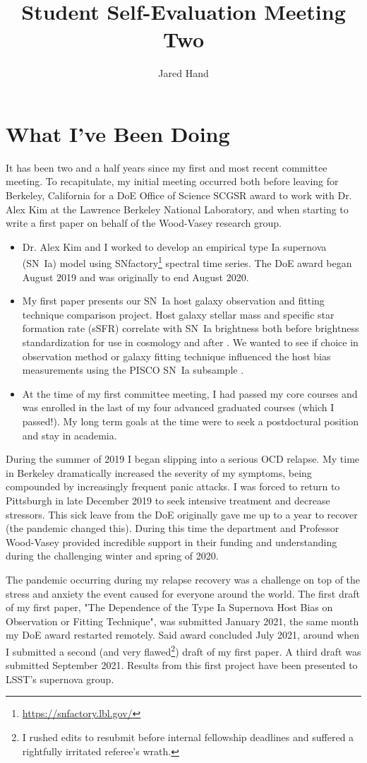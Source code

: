 \documentclass[modern]{aastex62}
\begin{document}
\title{Student Self-Evaluation Meeting Two}
\author{Jared Hand} 

\section{What I've Been Doing}
It has been two and a half years since my first and most recent committee meeting.  To recapitulate, my initial meeting occurred both before leaving for Berkeley, California for a DoE Office of Science SCGSR award to work with Dr. Alex Kim at the Lawrence Berkeley National Laboratory, and when starting to write a first paper on behalf of the Wood-Vasey research group.
\begin{itemize}
    \item Dr. Alex Kim and I worked to develop an empirical type Ia supernova (SN~Ia) model using SNfactory\footnote{\url{https://snfactory.lbl.gov/}} spectral time series.  The DoE award began August 2019 and was originally to end August 2020.  
    \item My first paper presents our SN~Ia host galaxy observation and fitting technique comparison project.  Host galaxy stellar mass and specific star formation rate (sSFR) correlate with SN~Ia brightness both before brightness standardization for use in cosmology and after \citep{sullivan2010,rigault2020}.  We wanted to see if choice in observation method  or galaxy fitting technique influenced the host bias measurements using the PISCO SN~Ia subsample \citep{galbany2018}.
    \item At the time of my first committee meeting, I had passed my core courses and was enrolled in the last of my four advanced graduated courses (which I passed!).  My long term goals at the time were to seek a postdoctural position and stay in academia.
\end{itemize}
During the summer of 2019 I began slipping into a serious OCD relapse.  My time in Berkeley dramatically increased the severity of my symptoms, being compounded by increasingly frequent panic attacks.  I was forced to return to Pittsburgh in late December 2019 to seek intensive treatment and decrease stressors.  This sick leave from the DoE originally gave me up to a year to recover (the pandemic changed this).  During this time the department and Professor Wood-Vasey provided incredible support in their funding and understanding during the challenging winter and spring of 2020.

The pandemic occurring during my relapse recovery was a challenge on top of the stress and anxiety the event caused for everyone around the world.  The first draft of my first paper, "The Dependence of the Type Ia Supernova Host Bias on Observation or Fitting Technique", was submitted January 2021, the same month my DoE award restarted remotely.  Said award concluded July 2021, around when I submitted a second (and very flawed\footnote{I rushed edits to resubmit before internal fellowship deadlines and suffered a rightfully irritated referee's wrath.}) draft of my first paper.  A third draft was submitted September 2021.  Results from this first project have been presented to LSST's supernova group.
\end{document}
